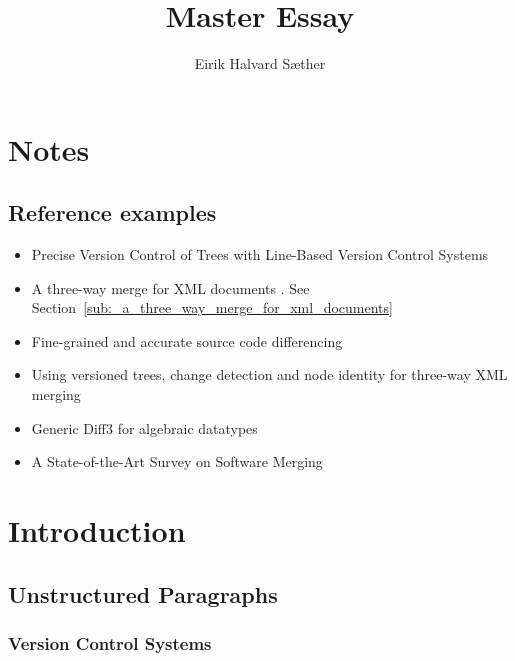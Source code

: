 \documentclass[a4paper,english]{ifimaster}
\title{Master Essay}
\author{Eirik Halvard Sæther}
\begin{document}
\maketitle
\newpage

\frontmatter{}

\tableofcontents

\mainmatter{}

\chapter{Notes}

\section{Reference examples}%
\label{sec:reference_examples}

\begin{itemize}
	\item Precise Version Control of Trees with Line-Based Version Control Systems \parencite{cite:precise_version_control_of_trees}
	\item A three-way merge for {XML} documents \parencite{cite:lindholm_xml_merge}. See Section~\ref{sub:_a_three_way_merge_for_xml_documents}
	\item Fine-grained and accurate source code differencing \parencite{cite:fine_grained_source_code_diff}
	\item Using versioned trees, change detection and node identity for three-way {XML} merging \parencite{cite:cheng_ethan_xml_merge}
	\item Generic Diff3 for algebraic datatypes \parencite{cite:generic_diff_for_adt}
	\item A State-of-the-Art Survey on Software Merging \parencite{cite:tom_mens_software_merging_survey}


\end{itemize}

\chapter{Introduction}%
\label{cha:introduction}

\section{Unstructured Paragraphs}%
\label{sec:unstructured_paragraphs}

\subsection{Version Control Systems}%
\label{sub:version_control_systems}
\end{document}
